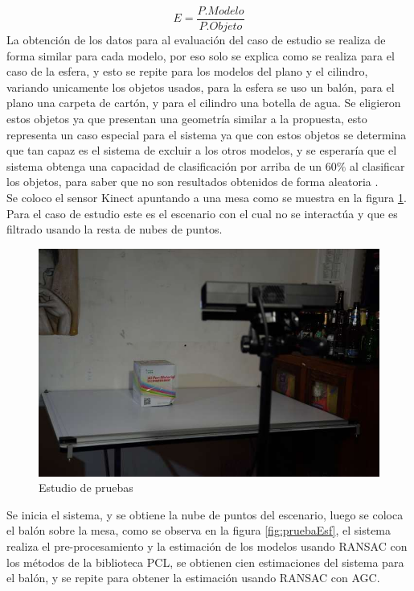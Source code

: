 		 \begin{equation}
		 \label{eq:exactitud}
		 E=\frac{P.Modelo}{P.Objeto}
		 \end{equation}
	La obtención de los datos para al evaluación del caso de estudio se realiza de forma similar para cada modelo, por eso solo se explica como se realiza para el caso de la \gls{esfera}, y esto se repite para los modelos del \gls{plano} y el \gls{cilindro}, variando unicamente los objetos usados, para la esfera se uso un balón, para el plano una carpeta de cartón, y para el cilindro una botella de agua. Se eligieron estos objetos ya que presentan una geometría similar a la propuesta, esto representa un caso especial para el sistema ya que con estos objetos se determina que tan capaz es el sistema de excluir a los otros modelos, y se esperaría que el sistema obtenga una capacidad de clasificación por arriba de un $60\%$ al clasificar los objetos, para saber que no son resultados obtenidos de forma aleatoria .\\
	
	Se coloco el sensor Kinect apuntando a una mesa como se muestra en la figura \ref{fig:casoDeESt}. Para el caso de estudio este es el escenario con el cual no se interactúa y que es filtrado usando la resta de nubes de puntos.\\
	
	\begin{figure}[!htb] 
		\centering
		\includegraphics[width=1\textwidth]{03Resultados/imagenes/casoDeEstudio.JPG}
		\caption{Estudio de pruebas} 
		\label{fig:casoDeESt}
	\end{figure}
	
	
	 Se inicia el sistema, y se obtiene la nube de puntos del escenario, luego se coloca el balón sobre la mesa, como se observa en la figura \ref{fig:pruebaEsf}, el sistema realiza el pre-procesamiento y la estimación de los modelos usando RANSAC con los métodos de la biblioteca PCL, se obtienen cien estimaciones del sistema para el balón, y se repite para obtener la estimación usando RANSAC con AGC.\\
	
